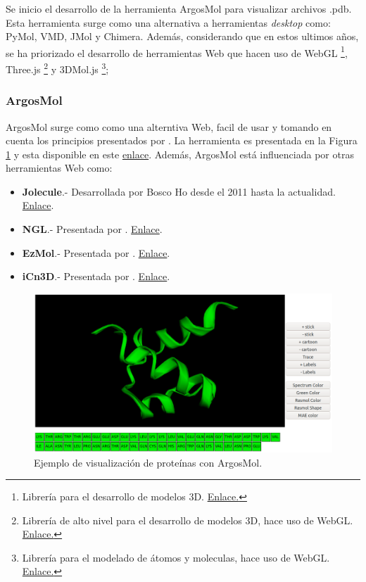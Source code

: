 \documentclass{article}
\begin{document}
Se inicio el desarrollo de la herramienta ArgosMol para visualizar archivos .pdb. Esta herramienta surge como una alternativa a  herramientas \textit{desktop} como: PyMol, VMD, JMol y Chimera. Además, considerando que en estos ultimos años, se ha priorizado el desarrollo de herramientas Web que hacen uso de WebGL \footnote{Librería para el desarrollo de modelos 3D. \href{https://get.webgl.org/}{Enlace.}}, 		
Three.js \footnote{Librería de alto nivel para el desarrollo de modelos 3D, hace uso de WebGL. \href{https://threejs.org/}{Enlace.}} y 		
3DMol.js \footnote{Librería para el modelado de átomos y moleculas, hace uso de WebGL. \href{https://threejs.org/}{Enlace.}}; 


\subsubsection{ArgosMol}

ArgosMol surge como como una alterntiva Web, facil de usar y tomando en cuenta los principios presentados por \cite{youkharibache2017twelve}. La herramienta es presentada en la Figura \ref{fig:argos1} y esta disponible en este \href{http://134.209.44.160/protein-web/3dmol/protein_interaction.php}{enlace}. Además, ArgosMol está influenciada por otras herramientas Web como:

\begin{itemize}
	\item \textbf{Jolecule}.- Desarrollada por Bosco Ho desde el 2011 hasta la actualidad. \href{http://jolecule.com/}{Enlace}.
	\item \textbf{NGL}.- Presentada por \cite{rose2015ngl}. \href{https://nglviewer.org/}{Enlace}.
	\item \textbf{EzMol}.- Presentada por \cite{reynolds2018ezmol}. \href{http://www.sbg.bio.ic.ac.uk/ezmol/}{Enlace}.
	\item \textbf{iCn3D}.- Presentada por \cite{wang2020icn3d}. \href{https://www.ncbi.nlm.nih.gov/Structure/icn3d/full.html}{Enlace}.	
\end{itemize}

\begin{figure}[H]
	\centering
	\includegraphics[width=\textwidth]{img/papers/argos1}
	\caption{ Ejemplo de visualización de proteínas con ArgosMol. }
	\label{fig:argos1}
\end{figure}
\end{document}
